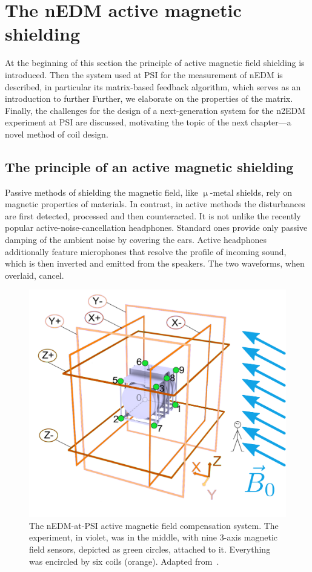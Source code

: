 \chapter{The nEDM active magnetic shielding}

\label{ch:nedm_sfc}

At the beginning of this section the principle of active magnetic field shielding is introduced. Then the system used at PSI for the measurement of nEDM is described, in particular its matrix-based feedback algorithm, which serves as an introduction to further Further, we elaborate on the properties of the matrix. Finally, the challenges for the design of a next-generation system for the n2EDM experiment at PSI are discussed, motivating the topic of the next chapter---a novel method of coil design.


\section{The principle of an active magnetic shielding}
Passive methods of shielding the magnetic field, like $\upmu$-metal shields, rely on magnetic properties of materials. In contrast, in active methods the disturbances are first detected, processed and then counteracted. It is not unlike the recently popular active-noise-cancellation headphones. Standard ones provide only passive damping of the ambient noise by covering the ears. Active headphones additionally feature microphones that resolve the profile of incoming sound, which is then inverted and emitted from the speakers. The two waveforms, when overlaid, cancel.

\begin{figure}
  \centering
  \includegraphics[width=0.8\linewidth]{gfx/nEDM_SFC/SFCplain.pdf}
  \caption{The nEDM-at-PSI active magnetic field compensation system. The experiment, in violet, was in the middle, with nine 3-axis magnetic field sensors, depicted as green circles, attached to it. Everything was encircled by six coils (orange). Adapted from~\cite{Franke2013}.}\label{fig:sfc-scheme}
\end{figure}


